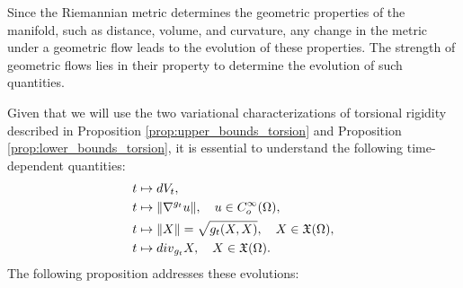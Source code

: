 \documentclass{amsart}
\theoremstyle{definition}
\theoremstyle{remark}
\newcommand{\V}{{\rm V}}
\begin{document}
 Since the Riemannian metric determines the geometric properties of the manifold, such as distance, volume, and curvature, any change in the metric under a geometric flow leads to the evolution of these properties. The strength of geometric flows lies in their property to determine the evolution of such quantities.

Given that we will use the two variational characterizations of torsional rigidity described in Proposition \ref{prop:upper_bounds_torsion} and Proposition \ref{prop:lower_bounds_torsion}, it is essential to understand the following time-dependent quantities:
$$
\begin{aligned}
t &\mapsto d\V_{t},\\
t &\mapsto \Vert \nabla^{g_t} u\Vert, \quad u \in C_o^\infty(\Omega),\\
t &\mapsto \Vert X\Vert = \sqrt{g_t(X,X)}, \quad X \in \mathfrak{X}(\Omega),\\
t &\mapsto {\rm div}_{g_t} X, \quad X \in \mathfrak{X}(\Omega).
\end{aligned}
$$
The following proposition addresses these evolutions:
\end{document}
